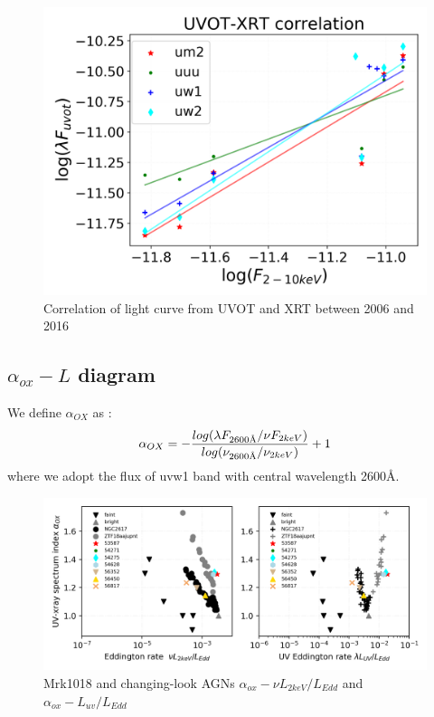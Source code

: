 \documentclass{aastex63}
\newcommand{\angstrom}{\text{\normalfont\AA}}
\begin{document}
\begin{figure}
\centering
	\includegraphics[width=0.6\columnwidth]{./pic/uvot_xrt_correlation-fig.png}
    \caption{Correlation of light curve from UVOT and XRT  between 2006 and 2016}
    \label{fig:correlation-uvot-xray}
\end{figure}















\subsection{$\alpha_{ox}-L $ diagram}\label{subsec:alpha_ox}
We define $\alpha_{OX} $ as :
 $$\alpha_{OX}  = - \frac{log(\lambda F_{2600 \angstrom}/\nu F_{2keV})}{log(\nu_{ 2600 \angstrom }/\nu_{2keV})}+1$$ where we adopt the flux of uvw1 band with central wavelength {2600{\AA}}.

\begin{figure}
\centering
	\includegraphics[width=\columnwidth]{./pic/Mrk1018_subplots_plus_2individuals_alpha_ox_L_x_Luv_rate.png}
    \caption{Mrk1018 and changing-look AGNs $\alpha_{ox}-\nu L_{2keV}/L_{Edd}$ and $\alpha_{ox}-L_{uv}/L_{Edd}$}
    \label{fig:alpha_ox_luv}
\end{figure}
\end{document}
